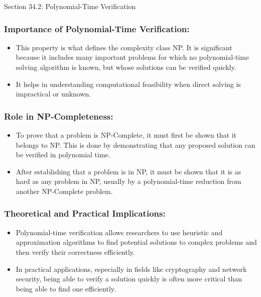 \begin{notes}{Section 34.2: Polynomial-Time Verification}
    
    \subsubsection*{Importance of Polynomial-Time Verification:}
    
    \begin{itemize}
        \item This property is what defines the complexity class NP. It is significant because it includes many important problems for which no polynomial-time solving algorithm is known, but whose 
        solutions can be verified quickly.
        \item It helps in understanding computational feasibility when direct solving is impractical or unknown.
    \end{itemize}
    
    \subsubsection*{Role in NP-Completeness:}
    
    \begin{itemize}
        \item To prove that a problem is NP-Complete, it must first be shown that it belongs to NP. This is done by demonstrating that any proposed solution can be verified in polynomial time.
        \item After establishing that a problem is in NP, it must be shown that it is as hard as any problem in NP, usually by a polynomial-time reduction from another NP-Complete problem.
    \end{itemize}
    
    \subsubsection*{Theoretical and Practical Implications:}
    
    \begin{itemize}
        \item Polynomial-time verification allows researchers to use heuristic and approximation algorithms to find potential solutions to complex problems and then verify their correctness efficiently.
        \item In practical applications, especially in fields like cryptography and network security, being able to verify a solution quickly is often more critical than being able to find one efficiently.
    \end{itemize}    
\end{notes}

